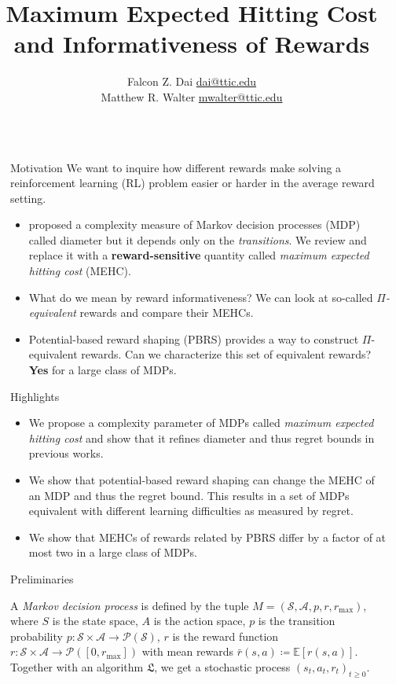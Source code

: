 \documentclass[final]{beamer}
\title{Maximum Expected Hitting Cost and Informativeness of Rewards}
\author{Falcon Z. Dai \hspace{4.5em} \url{dai@ttic.edu} \\
Matthew R. Walter \hspace{2em} \url{mwalter@ttic.edu}}
\institute[TTI-Chicago]{Toyota Technological Institute at Chicago}
\newcommand{\Exp}{\mathbb{E}}
\newlength{\sepwidth}
\newlength{\colwidth}
\newcommand{\separatorcolumn}{\begin{column}{\sepwidth}\end{column}}
\begin{document}
\begin{frame}[t]

\begin{columns}[t]
\separatorcolumn

\begin{column}{\colwidth}

  \begin{block}{Motivation}
  We want to inquire how different rewards make solving a reinforcement learning (RL) problem easier or harder in the average reward setting.
    \begin{itemize}
        \item \cite{jaksch2010near} proposed a complexity measure of Markov decision processes (MDP) called diameter but it depends only on the \emph{transitions}. We review and replace it with a \textbf{reward-sensitive} quantity called \emph{maximum expected hitting cost} (MEHC).
        \item What do we mean by reward informativeness? We can look at so-called \emph{$\Pi$-equivalent} rewards and compare their MEHCs.
        \item Potential-based reward shaping (PBRS) \cite{ng1999policy} provides a way to construct $\Pi$-equivalent rewards. Can we characterize this set of equivalent rewards? \textbf{Yes} for a large class of MDPs.
    \end{itemize}
  \end{block}

  \begin{alertblock}{Highlights}
    \begin{itemize}
      \item We propose a complexity parameter of MDPs called \textit{maximum expected hitting cost} and show that it refines diameter and thus regret bounds in previous works.
      \item We show that potential-based reward shaping can change the MEHC of an MDP and thus the regret bound. This results in a set of MDPs equivalent with different learning difficulties as measured by regret.
      \item We show that MEHCs of rewards related by PBRS differ by a factor of at most two in a large class of MDPs.
    \end{itemize}

  \end{alertblock}

  \begin{block}{Preliminaries}

    A \textit{Markov decision process} is defined by the tuple $M = (\mathcal{S}, \mathcal{A}, p, r, r_\text{max})$, where $S$ is the state space, $A$ is the action space, $p$ is the transition probability $p : \mathcal{S}\times \mathcal{A} \rightarrow \mathcal{P}(\mathcal{S})$, $r$ is the reward function $r : \mathcal{S} \times \mathcal{A} \rightarrow \mathcal{P}([0, r_\text{max}])$ with mean rewards $\bar{r}(s, a) \coloneqq \Exp[r(s, a)]$. Together with an algorithm $\mathfrak{L}$, we get a stochastic process $(s_t, a_t, r_t)_{t \geq 0}$.


\end{block}
\end{column}
\end{columns}
\end{frame}
\end{document}
